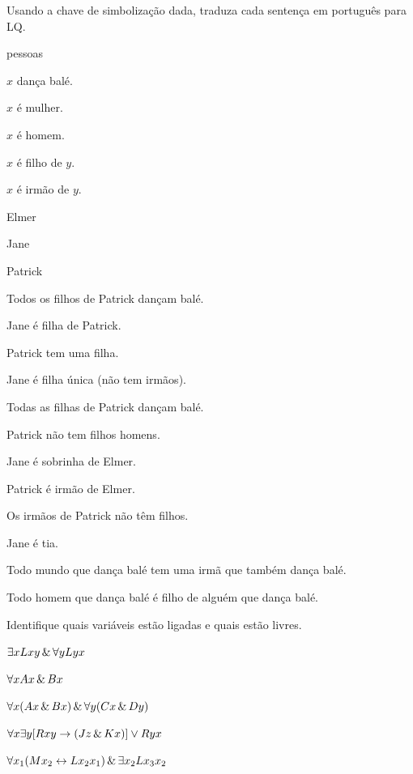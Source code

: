 \solutions
\problempart
\label{pr.QLballet}
Usando a chave de simbolização dada, traduza cada sentença em português para LQ.
\begin{ekey}
\item[UD:] pessoas
\item[Dx:] $x$ dança balé.
\item[Fx:] $x$ é mulher.
\item[Mx:] $x$ é homem.
\item[Cxy:] $x$ é filho de $y$.
\item[Sxy:] $x$ é irmão de $y$.
\item[e:] Elmer
\item[j:] Jane
\item[p:] Patrick
\end{ekey}
\begin{earg}
\item Todos os filhos de Patrick dançam balé.
\item Jane é filha de Patrick.
\item Patrick tem uma filha.
\item Jane é filha única (não tem irmãos).
\item Todas as filhas de Patrick dançam balé.
\item Patrick não tem filhos homens.
\item Jane é sobrinha de Elmer.
\item Patrick é irmão de Elmer.
\item Os irmãos de Patrick não têm filhos.
\item Jane é tia.
\item Todo mundo que dança balé tem uma irmã que também dança balé.
\item Todo homem que dança balé é filho de alguém que dança balé.
\end{earg}

\problempart
\label{pr.freeQL}
Identifique quais variáveis estão ligadas e quais estão livres.
\begin{earg}
\item $\exists x Lxy \,\&\, \forall y Lyx$
\item $\forall x Ax \,\&\, Bx$
\item $\forall x (Ax \,\&\, Bx) \,\&\, \forall y(Cx \,\&\, Dy)$
\item $\forall x\exists y[Rxy \rightarrow (Jz \,\&\, Kx)] \vee Ryx$
\item $\forall x_1(Mx_2 \leftrightarrow Lx_2x_1) \,\&\, \exists x_2 Lx_3x_2$
\end{earg}


